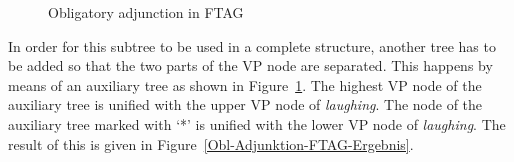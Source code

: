 \begin{figure}
\caption{\label{Obl-Adjunktion-FTAG}Obligatory adjunction in FTAG}
\end{figure}%
In order for this subtree to be used in a complete structure, another tree has to be added so that
the two parts of the VP node are separated. This happens
by means of an auxiliary tree as shown in Figure~\ref{Obl-Adjunktion-FTAG}. The highest VP node of the auxiliary tree is unified with the upper
VP node of \emph{laughing}. The node of the auxiliary tree marked with `*' is unified with the lower VP node of \emph{laughing}.
The result of this is given in Figure~\vref{Obl-Adjunktion-FTAG-Ergebnis}.
